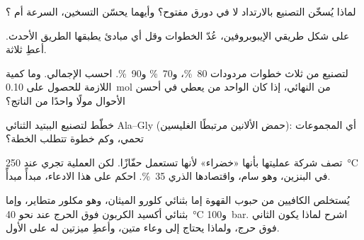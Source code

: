 \begin{exercise}[$\star\star$]\label{exo:g12:synthesis-strategy:10}
لماذا يُسخّن التصنيع بالارتداد لا في دورق مفتوح؟ وأيهما
يحسّن التسخين، السرعة أم ؟
\end{exercise}

\begin{exercise}[$\star\star$]\label{exo:g12:synthesis-strategy:11}
على شكل طريقي الإيبوبروفين، عُدّ الخطوات وقل أي
مبادئ  يطبقها الطريق الأحدث. أعطِ ثلاثة.
\end{exercise}

\begin{exercise}[$\star\star\star$]\label{exo:g12:synthesis-strategy:12}
لتصنيع من ثلاث خطوات مردودات \qty{80}{\percent}،
و\qty{70}{\percent} و\qty{90}{\percent}. احسب  الإجمالي.
وما كمية  اللازمة للحصول على \qty{0.10}{mol} من
 النهائي، إذا كان  الواحد من  يعطي في أحسن الأحوال مولًا واحدًا من
الناتج؟
\end{exercise}

\begin{exercise}[$\star\star\star$]\label{exo:g12:synthesis-strategy:13}
خطّط لتصنيع الببتيد الثنائي Ala--Gly (حمض الألانين مرتبطًا
 الغليسين): أي المجموعات تحمي، وكم خطوة
تتطلب الخطة؟
\end{exercise}

\begin{exercise}[$\star\star\star$]\label{exo:g12:synthesis-strategy:14}
تصف شركة عمليتها بأنها «خضراء» لأنها تستعمل حفّازًا. لكن
العملية تجري عند \qty{250}{\celsius} في البنزين، وهو  سام،
واقتصادها الذري \qty{35}{\percent}. احكم على هذا الادعاء، مبدأً
مبدأً.
\end{exercise}

\begin{exercise}[$\star\star\star$]\label{exo:g12:synthesis-strategy:15}
يُستخلص الكافيين من حبوب القهوة إما بثنائي كلورو الميثان، وهو
 مكلور متطاير، وإما بثنائي أكسيد الكربون فوق الحرج عند
نحو \qty{40}{\celsius} و\qty{100}{bar}. اشرح لماذا يكون الثاني
فوق حرج، ولماذا يحتاج إلى وعاء متين، وأعطِ ميزتين له
على الأول.
\end{exercise}

